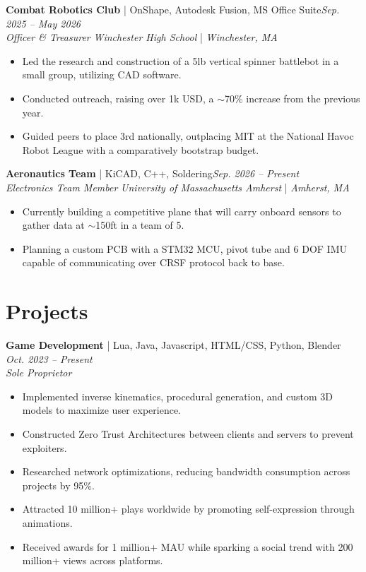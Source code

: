\documentclass[11pt]{article}       %
\begin{document}
\textbf{Combat Robotics Club} | OnShape, Autodesk Fusion, MS Office Suite\hfill \textit{Sep. 2025 – May 2026}\\
\vspace{-1pt}
\textit{Officer \& Treasurer}    \hfill \textit{Winchester High School} | \textit{Winchester, MA}\\
\vspace{-5pt}
\begin{itemize}
  \item Led the research and construction of a 5lb vertical spinner battlebot in a small group, utilizing CAD software. 
  \item Conducted outreach, raising over 1k USD, a $\sim$70\% increase from the previous year.
  \item Guided peers to place 3rd nationally, outplacing MIT at the National Havoc Robot League with a comparatively bootstrap budget.
\end{itemize}

\textbf{Aeronautics Team} | KiCAD, C++, Soldering\hfill \textit{Sep. 2026 – Present}\\
\vspace{-1pt}
\textit{Electronics Team Member}    \hfill \textit{University of Massachusetts Amherst} | \textit{Amherst, MA}\\
\vspace{-5pt}
\begin{itemize}
  \item Currently building a competitive plane that will carry onboard sensors to gather data at $\sim$150ft in a team of 5.
  \item Planning a custom PCB with a STM32 MCU, pivot tube and 6 DOF IMU capable of communicating over CRSF protocol back to base.
\end{itemize}

\vspace{-15pt}
\section*{Projects}
\textbf{Game Development} | Lua, Java, Javascript, HTML/CSS, Python, Blender \hfill \textit{Oct. 2023 – Present}\\
\vspace{-1pt}
\textit{Sole Proprietor}
\vspace{-5pt}
\begin{itemize}
  \item Implemented inverse kinematics, procedural generation, and custom 3D models to maximize user experience.
  \item Constructed Zero Trust Architectures between clients and servers to prevent exploiters.
  \item Researched network optimizations, reducing bandwidth consumption across projects by 95\%.
  \item Attracted 10 million+ plays worldwide by promoting self-expression through animations.
  \item Received awards for 1 million+ MAU while sparking a social trend with 200 million+ views across platforms.
\end{itemize}
\end{document}
